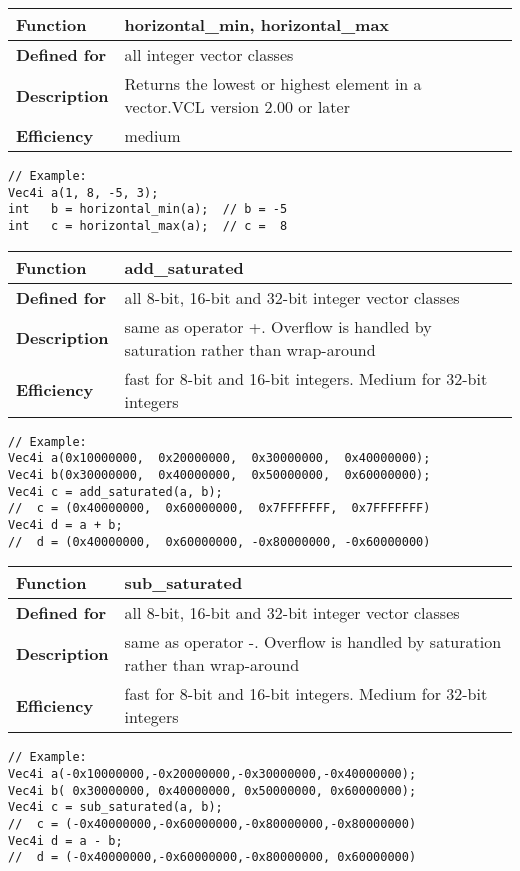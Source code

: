 \documentclass[vcl_manual.tex]{subfiles}
\begin{document}
\begin{tabular}{|p{25mm}|p{100mm}|}
\hline
\bfseries Function & horizontal\_min, horizontal\_max \\ \hline
\bfseries Defined for & all integer vector classes \\ \hline
\bfseries Description & Returns the lowest or highest element in a vector.\newline VCL version 2.00 or later \\ \hline
\bfseries Efficiency & medium \\ \hline
\end{tabular}
\begin{lstlisting}[frame=none]
// Example:
Vec4i a(1, 8, -5, 3);
int   b = horizontal_min(a);  // b = -5
int   c = horizontal_max(a);  // c =  8
\end{lstlisting}

\begin{tabular}{|p{25mm}|p{100mm}|}
\hline
\bfseries Function & add\_saturated\\ \hline
\bfseries Defined for & all 8-bit, 16-bit and 32-bit integer vector classes \\ \hline
\bfseries Description & same as operator +. Overflow is handled by saturation rather than wrap-around \\ \hline
\bfseries Efficiency & fast for 8-bit and 16-bit integers. Medium for 32-bit integers \\ \hline
\end{tabular}
\begin{lstlisting}[frame=none]
// Example:
Vec4i a(0x10000000,  0x20000000,  0x30000000,  0x40000000);
Vec4i b(0x30000000,  0x40000000,  0x50000000,  0x60000000);
Vec4i c = add_saturated(a, b);  
//  c = (0x40000000,  0x60000000,  0x7FFFFFFF,  0x7FFFFFFF)
Vec4i d = a + b;
//  d = (0x40000000,  0x60000000, -0x80000000, -0x60000000)
\end{lstlisting}


\begin{tabular}{|p{25mm}|p{100mm}|}
\hline
\bfseries Function & sub\_saturated\\ \hline
\bfseries Defined for & all 8-bit, 16-bit and 32-bit integer vector classes \\ \hline
\bfseries Description & same as operator -. Overflow is handled by saturation rather than wrap-around \\ \hline
\bfseries Efficiency & fast for 8-bit and 16-bit integers. Medium for 32-bit integers \\ \hline
\end{tabular}
\begin{lstlisting}[frame=none]
// Example:
Vec4i a(-0x10000000,-0x20000000,-0x30000000,-0x40000000);
Vec4i b( 0x30000000, 0x40000000, 0x50000000, 0x60000000);
Vec4i c = sub_saturated(a, b);  
//  c = (-0x40000000,-0x60000000,-0x80000000,-0x80000000)
Vec4i d = a - b;
//  d = (-0x40000000,-0x60000000,-0x80000000, 0x60000000)
\end{lstlisting}
\end{document}
